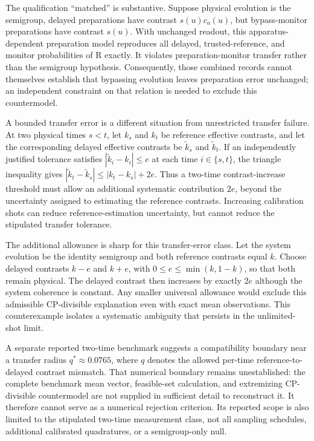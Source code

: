 \documentclass[11pt]{article}
\begin{document}
The qualification \textquotedblleft{}matched\textquotedblright{} is substantive. Suppose physical evolution is the semigroup, delayed preparations have contrast $s(u)c_a(u)$, but bypass-monitor preparations have contrast $s(u)$. With unchanged readout, this apparatus-dependent preparation model reproduces all delayed, trusted-reference, and monitor probabilities of R exactly. It violates preparation-monitor transfer rather than the semigroup hypothesis. Consequently, those combined records cannot themselves establish that bypassing evolution leaves preparation error unchanged; an independent constraint on that relation is needed to exclude this countermodel.

A bounded transfer error is a different situation from unrestricted transfer failure. At two physical times $s<t$, let $k_s$ and $k_t$ be reference effective contrasts, and let the corresponding delayed effective contrasts be $\widetilde k_s$ and $\widetilde k_t$. If an independently justified tolerance satisfies $|\widetilde k_i-k_i|\leq e$ at each time $i\in\{s,t\}$, the triangle inequality gives
$|\widetilde k_t-\widetilde k_s|\leq|k_t-k_s|+2e.$
Thus a two-time contrast-increase threshold must allow an additional systematic contribution $2e$, beyond the uncertainty assigned to estimating the reference contrasts. Increasing calibration shots can reduce reference-estimation uncertainty, but cannot reduce the stipulated transfer tolerance.

The additional allowance is sharp for this transfer-error class. Let the system evolution be the identity semigroup and both reference contrasts equal $k$. Choose delayed contrasts $k-e$ and $k+e$, with $0\leq e\leq\min(k,1-k)$, so that both remain physical. The delayed contrast then increases by exactly $2e$ although the system coherence is constant. Any smaller universal allowance would exclude this admissible CP-divisible explanation even with exact mean observations. This counterexample isolates a systematic ambiguity that persists in the unlimited-shot limit.

A separate reported two-time benchmark suggests a compatibility boundary near a transfer radius $q^*\approx0.0765$, where $q$ denotes the allowed per-time reference-to-delayed contrast mismatch. That numerical boundary remains unestablished: the complete benchmark mean vector, feasible-set calculation, and extremizing CP-divisible countermodel are not supplied in sufficient detail to reconstruct it. It therefore cannot serve as a numerical rejection criterion. Its reported scope is also limited to the stipulated two-time measurement class, not all sampling schedules, additional calibrated quadratures, or a semigroup-only null.
\end{document}
